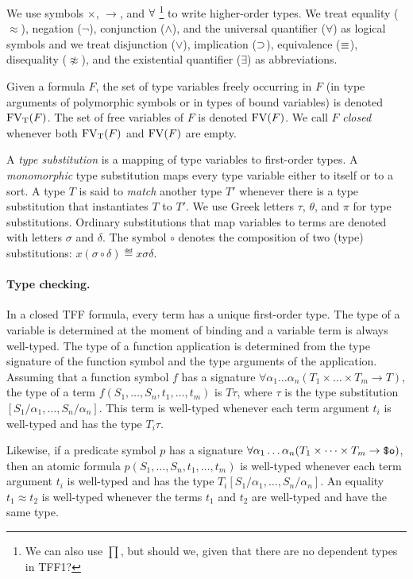 We use symbols ${\times}$, ${\to}$, and ${\forall}$%
\footnote{We can also use ${\prod}$, but should we,
given that there are no dependent types in TFF1?}
to write higher-order types. We treat equality ($\approx$),
negation ($\lnot$), conjunction ($\land$), and the universal
quantifier ($\forall$) as logical symbols and we treat
disjunction ($\lor$), implication ($\supset$), equivalence
($\equiv$), disequality ($\not\approx$), and the existential
quantifier ($\exists$) as abbreviations.

Given a formula $F$, the set of type variables
freely occurring in $F$ (in type arguments of
polymorphic symbols or in types of bound variables)
is denoted $\mathrm{FV}_\mathrm{T}(F)$. The set of free variables of $F$
is denoted $\mathrm{FV}(F)$. We call $F$ {\em closed\/}
whenever both $\mathrm{FV}_\mathrm{T}(F)$ and $\mathrm{FV}(F)$ are empty.

A {\em type substitution\/} is a mapping of type variables
to first-order types. A {\em monomorphic\/} type substitution
maps every type variable either to itself or to a sort.
%
A type $T$ is said to {\em match\/} another
type $T'$ whenever there is a type substitution
that instantiates $T$ to $T'$.
We use Greek letters $\tau$, $\theta$, and $\pi$ for type
substitutions.
Ordinary substitutions that map variables to terms
are denoted with letters $\sigma$ and $\delta$.
The symbol $\circ$ denotes the composition
of two (type) substitutions:
$x(\sigma \circ \delta) \eqdef x\sigma\delta$.

\paragraph{Type checking.} In a closed TFF formula, every term has
a unique first-order type. The type of a variable is determined at
the moment of binding and a variable term is always well-typed.
The type of a function application is determined from the type
signature of the function symbol and the type arguments of the
application. Assuming that a function symbol $f$ has a signature
$\forall \alpha_1\dots\alpha_n (T_1 \times \dots \times T_m \to T)$,
the type of a term $f(S_1,\dots,S_n,t_1,\dots,t_m)$ is $T\tau$, where
$\tau$ is the type substitution $[S_1/\alpha_1,\dots,S_n/\alpha_n]$.
This term is well-typed whenever each term argument $t_i$
is well-typed and has the type $T_i\tau$.

Likewise, if a predicate symbol $p$ has a signature
$\forall \alpha_1\dots\alpha_n (T_1 \times \dots \times T_m
\to \text{\tt \$o})$, then an atomic formula
$p(S_1,\dots,S_n,t_1,\dots,t_m)$ is well-typed
whenever each term argument $t_i$ is well-typed and has
the type $T_i[S_1/\alpha_1,\dots,S_n/\alpha_n]$.
%
An equality $t_1 \approx t_2$ is well-typed whenever
the terms $t_1$ and $t_2$ are well-typed and have the same type.

